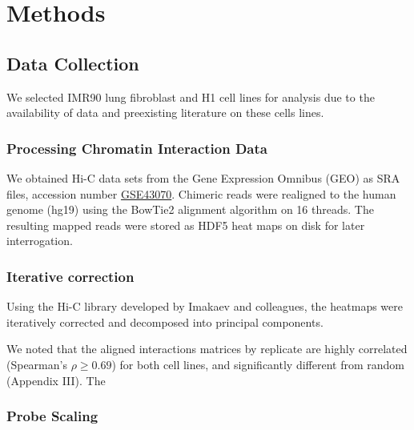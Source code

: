 \chapter{Methods}

\section*{Data Collection}

We selected IMR90 lung fibroblast and H1  cell lines for analysis due to the availability of data and
preexisting literature on these cells lines.

\subsection*{Processing Chromatin Interaction Data}

We obtained Hi-C data sets from the Gene Expression Omnibus (GEO)\cite{edgar2002} as \gls{SRA} files,
accession number \href{http://www.ncbi.nlm.nih.gov/geo/query/acc.cgi?acc=GSE43070}{GSE43070}.  Chimeric reads were realigned
to the human genome (hg19) using the BowTie2 alignment algorithm on 16 threads\cite{langmead2012}.  The resulting mapped
reads were stored as HDF5 heat maps on disk for later interrogation.


\subsection*{Iterative correction}
Using the Hi-C library developed by Imakaev and colleagues\cite{imakaev2012}, the heatmaps were iteratively corrected
and decomposed into principal components.

We noted that the aligned interactions matrices by replicate are highly correlated (Spearman's $\rho \geq 0.69$)  %
for both cell lines, and significantly different from random (Appendix III).  The


\subsection*{Probe Scaling}




